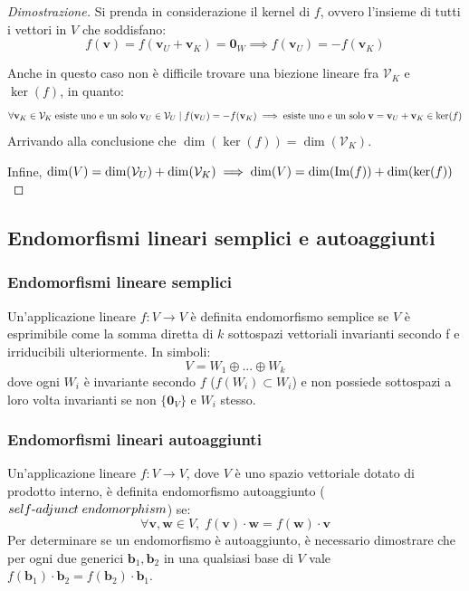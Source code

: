 \documentclass{article}
\begin{document}
\begin{proof}[Dimostrazione]
        \vspace{10pt}
        Si prenda in considerazione il kernel di $f$, ovvero l'insieme di tutti i vettori in $V$ che soddisfano:
        \[
            f(\mathbf{v}) = f(\mathbf{v}_U + \mathbf{v}_K) = \mathbf{0}_W \implies f(\mathbf{v}_U) = -f(\mathbf{v}_K) 
        \]

        Anche in questo caso non è difficile trovare una biezione lineare fra $\mathcal{V}_K$ e $\ker(f)$, in quanto:
        \[
            \forall \mathbf{v}_K \in \mathcal{V}_K \; \textnormal{esiste uno e un solo} \; \mathbf{v}_U \in \mathcal{V}_U \; | \; f(\mathbf{v}_U) = -f(\mathbf{v}_K) \implies \textnormal{esiste uno e un solo} \; \mathbf{v} = \mathbf{v}_U + \mathbf{v}_K \in \ker(f)
        \]
        Arrivando alla conclusione che $\dim(\ker(f)) = \dim(\mathcal{V}_K)$.

        \vspace{10pt}
        Infine, $\dim(V) = \dim(\mathcal{V}_U) + \dim(\mathcal{V}_K) \implies \dim(V) = \dim(\textnormal{Im}(f)) + \dim(\ker(f))$
    \end{proof}




\vspace{10pt}
\subsection{Endomorfismi lineari semplici e autoaggiunti} \label{subsec:linappend}
    \subsubsection{Endomorfismi lineare semplici} \label{subsubsec:linappsimpleend}
    Un'applicazione lineare $f : V \rightarrow V$ è definita endomorfismo semplice se $V$ è esprimibile come la somma diretta di $k$ sottospazi vettoriali invarianti secondo f e irriducibili ulteriormente. In simboli:
    \[
        V = W_1 \oplus ... \oplus W_k 
    \]
    dove ogni $W_i$ è invariante secondo $f$ ($f(W_i) \subset W_i$) e non possiede sottospazi a loro volta invarianti se non $\{\mathbf{0}_V\}$ e $W_i$ stesso.

    \vspace{10pt}
    \subsubsection{Endomorfismi lineari autoaggiunti} \label{subsubsec:linappsadjend}
    Un'applicazione lineare $f: V \rightarrow V$, dove $V$ è uno spazio vettoriale dotato di prodotto interno, è definita endomorfismo autoaggiunto ($self \textnormal{-} adjunct \; endomorphism$) se:
    \[
        \forall \mathbf{v}, \mathbf{w} \in V, \; f(\mathbf{v}) \cdot \mathbf{w} = f(\mathbf{w}) \cdot \mathbf{v}  
    \]
    Per determinare se un endomorfismo è autoaggiunto, è necessario dimostrare che per ogni due generici $\mathbf{b}_{1}, \mathbf{b}_{2}$ in una qualsiasi base di $V$ vale
    $f(\mathbf{b}_{1}) \cdot \mathbf{b}_{2} = f(\mathbf{b}_{2}) \cdot \mathbf{b}_{1}$.
\end{document}
